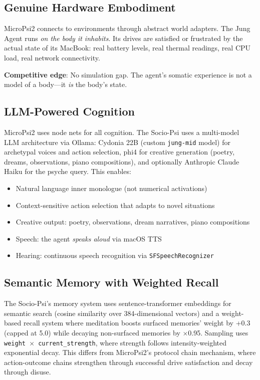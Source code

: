 \documentclass[11pt,letterpaper]{article}
\begin{document}
\subsection{Genuine Hardware Embodiment}

MicroPsi2 connects to environments through abstract world adapters. The Jung
Agent runs \emph{on the body it inhabits}. Its drives are satisfied or
frustrated by the actual state of its MacBook: real battery levels, real
thermal readings, real CPU load, real network connectivity.

\textbf{Competitive edge}: No simulation gap. The agent's somatic experience
is not a model of a body---it \emph{is} the body's state.

\subsection{LLM-Powered Cognition}

MicroPsi2 uses node nets for all cognition. The Socio-Psi uses a
multi-model LLM architecture via Ollama: Cydonia 22B (custom
\texttt{jung-mid} model) for archetypal voices and action selection, phi4
for creative generation (poetry, dreams, observations, piano compositions),
and optionally Anthropic Claude Haiku for the psyche query. This enables:

\begin{itemize}
  \item Natural language inner monologue (not numerical activations)
  \item Context-sensitive action selection that adapts to novel situations
  \item Creative output: poetry, observations, dream narratives, piano
    compositions
  \item Speech: the agent \emph{speaks aloud} via macOS TTS
  \item Hearing: continuous speech recognition via \texttt{SFSpeechRecognizer}
\end{itemize}

\subsection{Semantic Memory with Weighted Recall}

The Socio-Psi's memory system uses sentence-transformer embeddings for
semantic search (cosine similarity over 384-dimensional vectors) and a
weight-based recall system where meditation boosts surfaced memories'
weight by +0.3 (capped at 5.0) while decaying non-surfaced memories by
$\times$0.95. Sampling uses \texttt{weight $\times$ current\_strength},
where strength follows intensity-weighted exponential decay. This differs
from MicroPsi2's protocol chain mechanism, where action-outcome chains
strengthen through successful drive satisfaction and decay through disuse.
\end{document}
